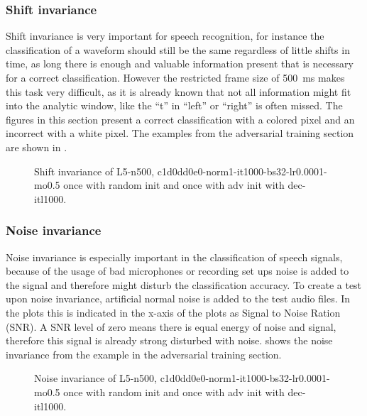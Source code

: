 
\subsubsection{Shift invariance}
Shift invariance is very important for speech recognition, for instance the classification of a waveform should still be the same regardless of little shifts in time, as long there is enough and valuable information present that is necessary for a correct classification.
However the restricted frame size of \SI{500}{\milli\second} makes this task very difficult, as it is already known that not all information might fit into the analytic window, like the \enquote{t} in \enquote{left} or \enquote{right} is often missed.
The figures in this section present a correct classification with a colored pixel and an incorrect with a white pixel.
The examples from the adversarial training section are shown in .
\begin{figure}[!ht]
  \centering
  \caption{Shift invariance of L5-n500, c1d0dd0e0-norm1-it1000-bs32-lr0.0001-mo0.5 once with random init and once with adv init with dec-itl1000.}
  \label{fig:exp_tb_shift_fc3}
\end{figure}
\FloatBarrier
\noindent



\subsubsection{Noise invariance}
Noise invariance is especially important in the classification of speech signals, because of the usage of bad microphones or recording set ups noise is added to the signal and therefore might disturb the classification accuracy.
To create a test upon noise invariance, artificial normal noise is added to the test audio files.
In the plots this is indicated in the x-axis of the plots as Signal to Noise Ration (SNR).
A SNR level of zero means there is equal energy of noise and signal, therefore this signal is already strong disturbed with noise.
 shows the noise invariance from the example in the adversarial training section.

\begin{figure}[!ht]
  \centering
  \caption{Noise invariance of L5-n500, c1d0dd0e0-norm1-it1000-bs32-lr0.0001-mo0.5 once with random init and once with adv init with dec-itl1000.}
  \label{fig:exp_tb_noise_fc3}
\end{figure}
\FloatBarrier
\noindent
